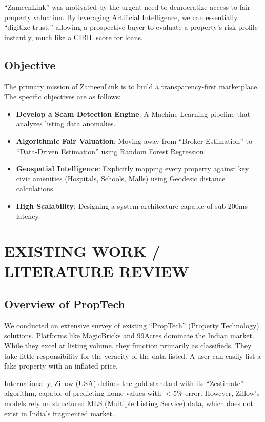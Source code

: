 \documentclass[12pt,a4paper]{report}
\begin{document}
``ZameenLink'' was motivated by the urgent need to democratize access to fair property valuation. By leveraging Artificial Intelligence, we can essentially ``digitize trust,'' allowing a prospective buyer to evaluate a property's risk profile instantly, much like a CIBIL score for loans.

\section{Objective}
The primary mission of ZameenLink is to build a transparency-first marketplace. The specific objectives are as follows:

\begin{itemize}
    \item \textbf{Develop a Scam Detection Engine}: A Machine Learning pipeline that analyzes listing data anomalies.
    \item \textbf{Algorithmic Fair Valuation}: Moving away from ``Broker Estimation'' to ``Data-Driven Estimation'' using Random Forest Regression.
    \item \textbf{Geospatial Intelligence}: Explicitly mapping every property against key civic amenities (Hospitals, Schools, Malls) using Geodesic distance calculations.
    \item \textbf{High Scalability}: Designing a system architecture capable of sub-200ms latency.
\end{itemize}

\chapter{EXISTING WORK / LITERATURE REVIEW}

\section{Overview of PropTech}
We conducted an extensive survey of existing ``PropTech'' (Property Technology) solutions. Platforms like MagicBricks and 99Acres dominate the Indian market. While they excel at listing volume, they function primarily as classifieds. They take little responsibility for the veracity of the data listed. A user can easily list a fake property with an inflated price.

Internationally, Zillow (USA) defines the gold standard with its ``Zestimate'' algorithm, capable of predicting home values with $<5\%$ error. However, Zillow's models rely on structured MLS (Multiple Listing Service) data, which does not exist in India's fragmented market.
\end{document}

